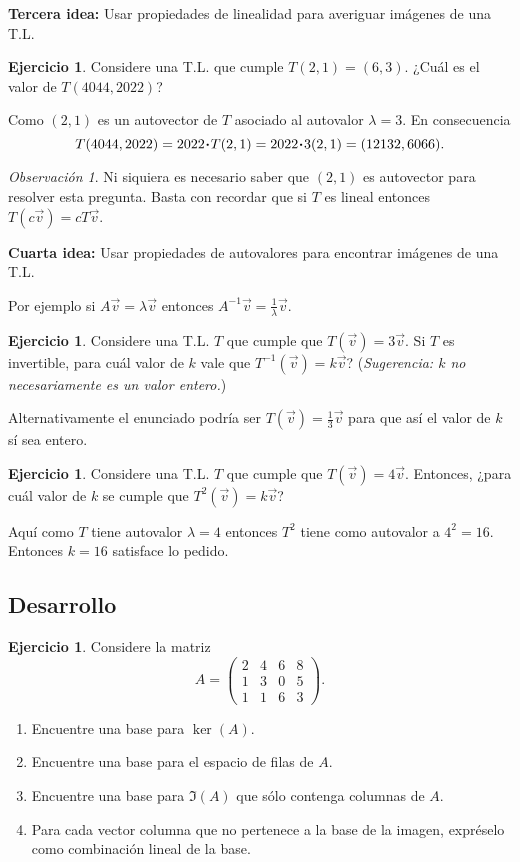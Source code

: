\documentclass[12pt]{article}
\theoremstyle{plain}
\theoremstyle{definition}
\newtheorem{Ej}[Th]{Ejercicio}         %
\theoremstyle{remark}
\newtheorem*{Rmk}{Observación}      %
\newcommand{\la}{\lambda}           %
\renewcommand{\:}{\colon}           %
\renewcommand{\.}{\Cdot}                %
\begin{document}
\textbf{Tercera idea:} Usar propiedades de linealidad para averiguar imágenes de una T.L.

\begin{Ej}
  Considere una T.L. que cumple $T(2,1)=(6,3)$. ¿Cuál es el valor de $T(4044,2022)$?
\end{Ej}

Como $(2,1)$ es un autovector de $T$ asociado al autovalor $\la=3$. En consecuencia 
$$T(4044,2022)=2022\.T(2,1)=2022\.3(2,1)=(12132,6066).$$

\begin{Rmk}
  Ni siquiera es necesario saber que $(2,1)$ es autovector para resolver esta pregunta. Basta con recordar que si $T$ es lineal entonces $T(c\vec{v})=cT\vec{v}$.
\end{Rmk}

\textbf{Cuarta idea:} Usar propiedades de autovalores para encontrar imágenes de una T.L. 

Por ejemplo si $A\vec{v}=\la \vec{v}$ entonces $A^{-1}\vec{v}=\frac{1}{\la}\vec{v}$.

\begin{Ej}
  Considere una T.L. $T$ que cumple que $T(\vec{v})=3\vec{v}$. Si $T$ es invertible, para cuál valor de $k$ vale que $T^{-1}(\vec{v})=k\vec{v}$? (\emph{Sugerencia: $k$ no necesariamente es un valor entero.})
\end{Ej}

Alternativamente el enunciado podría ser $T(\vec{v})=\frac{1}{3}\vec{v}$ para que así el valor de $k$ sí sea entero.

\begin{Ej}
  Considere una T.L. $T$ que cumple que $T(\vec{v})=4\vec{v}$. Entonces, ¿para cuál valor de $k$ se cumple que $T^2(\vec{v})=k\vec{v}$?
\end{Ej}

Aquí como $T$ tiene autovalor $\la=4$ entonces $T^2$ tiene como autovalor a $4^2=16$. Entonces $k=16$ satisface lo pedido.
\newpage
\subsection*{Desarrollo}

\begin{Ej}
  Considere la matriz 
  $$A=\begin{pmatrix}
    2&4&6&8\\1&3&0&5\\1&1&6&3
  \end{pmatrix}.$$
\begin{enumerate}
  \item Encuentre una base para $\ker(A)$.
  \item Encuentre una base para el espacio de filas de $A$.
  \item Encuentre una base para $\Im(A)$ que sólo contenga columnas de $A$.
  \item Para cada vector columna que no pertenece a la base de la imagen, expréselo como combinación lineal de la base.
\end{enumerate}
\end{Ej}
\end{document}
